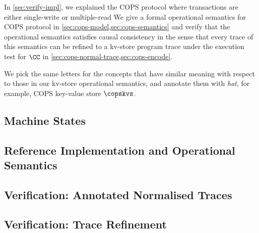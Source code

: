 
In \cref{sec:verify-impl}, we explained the COPS protocol 
where transactions are either single-write or multiple-read
We give a formal operational semantics for COPS protocol in \cref{sec:cops-model,sec:cops-semantics}
and verify that the operational semantics satisfies causal consistency in the sense that
every trace of this semantics can be refined to a kv-store program trace under the execution test for \( \CC \) in \cref{sec:cops-normal-trace,sec:cops-encode}.

We pick the same letters for the concepts that have similar meaning with respect to those in our kv-store operational semantics,
and annotate them with \emph{hat}, for example, COPS key-value store \( \copskvs \).

\subsection{Machine States} \label{sec:cops-model}  
\subsection{Reference Implementation and Operational Semantics} \label{sec:cops-semantics}  
\subsection{Verification: Annotated Normalised Traces} 
\label{sec:cops-normal-trace}  
\label{sec:cops-extended-trace}  
\subsection{Verification: Trace Refinement} \label{sec:cops-encode}  
